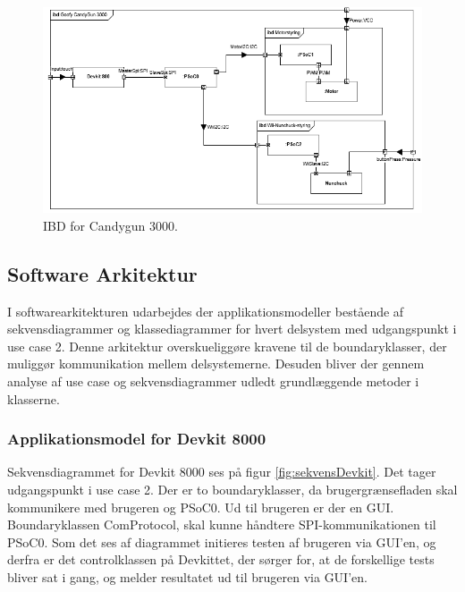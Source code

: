 \begin{figure}[H]
	\centering
	\includegraphics[width=\textwidth]{Systemarkitektur/images/GoofycandygunIBD.png}
	\caption{IBD for Candygun 3000.}
	\label{fig:IBD}
\end{figure}

\subsection{Software Arkitektur}
I softwarearkitekturen udarbejdes der applikationsmodeller bestående af sekvensdiagrammer og klassediagrammer for hvert delsystem med udgangspunkt i use case 2. Denne arkitektur overskueliggøre kravene til de boundaryklasser, der muliggør kommunikation mellem delsystemerne. Desuden bliver der gennem analyse af use case og sekvensdiagrammer udledt grundlæggende metoder i klasserne.  

\subsubsection{Applikationsmodel for Devkit 8000}
Sekvensdiagrammet for Devkit 8000 ses på figur \ref{fig:sekvensDevkit}. Det tager udgangspunkt i use case 2. Der er to boundaryklasser, da brugergrænsefladen skal kommunikere med brugeren og PSoC0. Ud til brugeren er der en GUI. Boundaryklassen ComProtocol, skal kunne håndtere SPI-kommunikationen til PSoC0. Som det ses af diagrammet initieres testen af brugeren via GUI'en, og derfra er det controlklassen på Devkittet, der sørger for, at de forskellige tests bliver sat i gang, og melder resultatet ud til brugeren via GUI'en.

